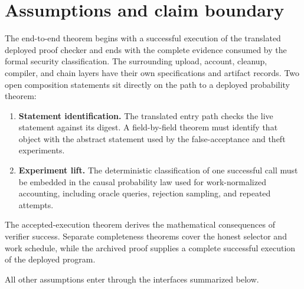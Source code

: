 \section{Assumptions and claim boundary}
\label{sec:limitations}

The end-to-end theorem begins with a successful execution of the translated
deployed proof checker and ends with the complete evidence consumed by the
formal security classification.  The surrounding upload, account, cleanup,
compiler, and chain layers have their own specifications and artifact records.
Two open composition statements sit directly on the path to a deployed
probability theorem:

\begin{enumerate}[leftmargin=*]
  \item \textbf{Statement identification.}  The translated entry path checks
        the live statement against its digest.  A field-by-field theorem must
        identify that object with the abstract statement used by the
        false-acceptance and theft experiments.
  \item \textbf{Experiment lift.}  The deterministic classification of one
        successful call must be embedded in the causal probability law used
        for work-normalized accounting, including oracle queries, rejection
        sampling, and repeated attempts.
\end{enumerate}

The accepted-execution theorem derives the mathematical consequences of
verifier success.  Separate completeness theorems cover the honest selector
and work schedule, while the archived proof supplies a complete successful
execution of the deployed program.

All other assumptions enter through the interfaces summarized below.

